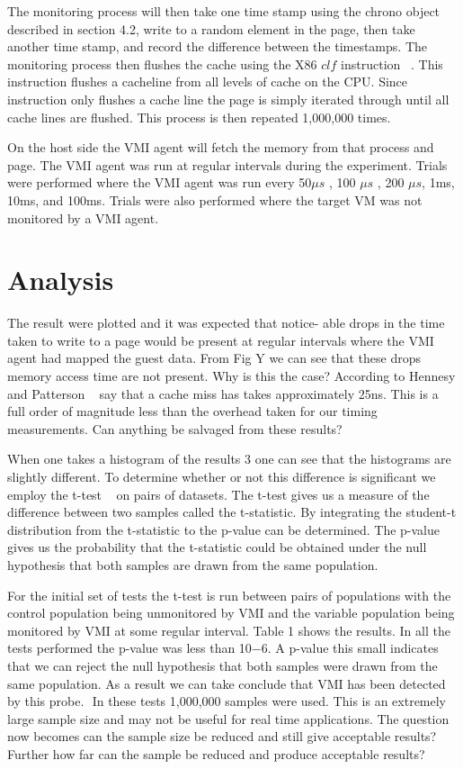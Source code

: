 The monitoring process will then take one time stamp using the chrono object described in section 4.2, write to a random element in the page, then take another time stamp, and record the difference between the timestamps. The monitoring process then flushes the cache using the X86 $clf$ instruction ~\cite{_intel_2014}. This instruction flushes a cacheline from all levels of cache on the CPU. Since instruction only flushes a cache line the page is simply iterated through until all cache lines are flushed. This process is then repeated 1,000,000 times. 

On the host side the VMI agent will fetch the memory from that process and page. The VMI agent was run at regular intervals during the experiment. Trials were performed where the VMI agent was run every 50$\mu s$ , 100 $\mu s$ , 200 $\mu s$, 1ms, 10ms, and 100ms. Trials were also performed where the target VM was not monitored by a VMI agent. 

\section{Analysis}

The result were plotted and it was expected that notice- able drops in the time taken to write to a page would be present at regular intervals where the VMI agent had mapped the guest data. From Fig Y we can see that these drops memory access time are not present. Why is this the case? According to Hennesy and Patterson ~\cite{hennessy_computer_2012} say that a cache miss has takes approximately 25ns. This is a full order of magnitude less than the overhead taken for our timing measurements. Can anything be salvaged from these results? 

When one takes a histogram of the results 3 one can see that the histograms are slightly different. To determine whether or not this difference is significant we employ the t-test ~\cite{welch_generalization_1947} on pairs of datasets. The t-test gives us a measure of the difference between two samples called the t-statistic. By integrating the student-t distribution from the t-statistic to the p-value can be determined. The p-value gives us the probability that the t-statistic could be obtained under the null hypothesis that both samples are drawn from the same population. 

For the initial set of tests the t-test is run between pairs of populations with the control population being unmonitored by VMI and the variable population being monitored by VMI at some regular interval. Table 1 shows the results. 
In all the tests performed the p-value was less than 10−6. A p-value this small indicates that we can reject the null hypothesis that both samples were drawn from the same population. As a result we can take conclude that VMI has been detected by this probe. 
In these tests 1,000,000 samples were used. This is an extremely large sample size and may not be useful for real time applications. The question now becomes can the sample size be reduced and still give acceptable results? Further how far can the sample be reduced and produce acceptable results? 

